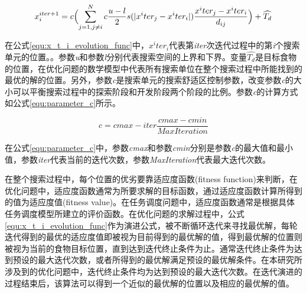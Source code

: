 \begin{equation}\label{equ:x_t_i_evolution_func}
    x^{iter+1}_i = c \Bigl(\sum_{j=1,j\neq{i}}^N c \frac{u-l}{2}s (\lvert x^iter_j-x^iter_i \rvert )\frac{x^iter_j-x^iter_i}{d_{ij}} \Bigr) + \widehat{T_d}
\end{equation}

在公式\ref{equ:x_t_i_evolution_func}中，$x^iter_i$代表第\emph{iter}次迭代过程中的第\emph{i}个搜索单元的位置。。参数\emph{u}和参数\emph{l}分别代表搜索空间的上界和下界。变量$\widehat{T_d}$是目标食物的位置，在优化问题的数学模型中代表所有搜索单位在整个搜索过程中所能找到的最优的解的位置。另外，参数\emph{c}是搜索单元的搜索舒适区控制参数，改变参数\emph{c}的大小可以平衡搜索过程中的探索阶段和开发阶段两个阶段的比例。参数\emph{c}的计算方式如公式\ref{equ:parameter_c}所示。

\begin{equation}\label{equ:parameter_c}
    c = cmax - iter \frac{cmax - cmin}{MaxIteration}
\end{equation}


在公式\ref{equ:parameter_c}中，参数\emph{cmax}和参数\emph{cmin}分别是参数\emph{c}的最大值和最小值，参数\emph{iter}代表当前的迭代次数，参数\emph{MaxIteration}代表最大迭代次数。

在整个搜索过程中，每个位置的优劣要靠适应度函数(fitness function)来判断，在优化问题中，适应度函数通常为所要求解的目标函数，通过适应度函数计算所得到的值为适应度值(fitness value)。在任务调度问题中，适应度函数通常是根据具体任务调度模型所建立的评价函数。在优化问题的求解过程中，公式\ref{equ:x_t_i_evolution_func}作为演进公式，被不断循环迭代来寻找最优解，每轮迭代得到的最优的适应度值即被视为目前得到的最优解的值，得到最优解的位置则被视为当前的食物目标位置，直到达到迭代终止条件为止。通常迭代终止条件为达到预设的最大迭代次数，或者所得到的最优解满足预设的最优解条件。在本研究所涉及到的优化问题中，迭代终止条件均为达到预设的最大迭代次数。在迭代演进的过程结束后，该算法可以得到一个近似的最优解的位置以及相应的最优解的值。

